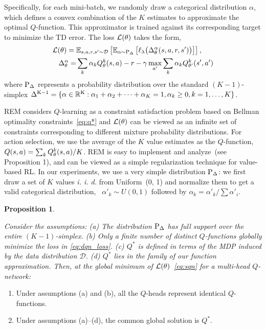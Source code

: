 Specifically, for each mini-batch, we randomly draw a categorical
distribution $\alpha$, which defines a convex combination of the $K$
estimates to approximate the optimal $Q$-function. This approximator
is trained against its corresponding target to minimize the TD
error. The loss $\mathcal{L}(\theta)$ takes the form,
\begin{align}\label{eq:sqn}
\mathcal{L}(\theta) ={}& \mathbb{E}_{s, a, r, s' \sim \mathcal{D}} \left[\mathbb{E}_{\alpha \sim {\textnormal{P}}_{\Delta}} \left[\ell_{\lambda} \big( \Delta^{\alpha}_\theta(s, a, r, s') \big)\right]\right], \\
\Delta^{\alpha}_\theta =& \sum_{k} \alpha_{k} Q_{\theta}^{k}(s, a) - r - \gamma\max_{a'} \sum_{k} \alpha_{k}Q_{\theta^{\prime}}^{k}(s', a') \nonumber
\end{align}
where ${\textnormal{P}}_{\Delta}$ represents a probability distribution over the
standard $(K-1)$-simplex $\Delta^{{\textnormal{K}} - 1}
= \{\alpha \in \mathbb{R}^{{\textnormal{K}}}: \alpha_{1}+ \alpha_{2} + \dots
+ \alpha_{K}=1, \alpha_{k}\geq 0, k=1,\dots,K\}$.

REM considers $Q$-learning as a constraint satisfaction problem based
on Bellman optimality constraints~\eqref{eq:q*} and $\mathcal{L}(\theta)$ can be viewed as an infinite set of constraints
corresponding to different mixture probability distributions.
For action selection, %
we use the average of the $K$ value estimates as the $Q$-function, \ie~$Q(s,a)
= \sum_{k} Q_{\theta}^{k}(s, a) / K$. REM is easy to implement and analyze~(see Proposition 1),
and can be viewed as a simple regularization technique for value-based RL.
In our experiments, we use a very
simple distribution ${\textnormal{P}}_{\Delta}$: we first
draw a set of $K$ values {\em i. \!i.\! d.} from Uniform~(0, 1) and
normalize them to get a valid categorical
distribution, \ie~$\alpha'_k \sim U(0, 1)$ followed by $\alpha_k
= \alpha'_k / \sum \alpha'_i$.

\textbf{Proposition 1}.
{\it
Consider the assumptions:
(a) The distribution ${\textnormal{P}}_{\Delta}$ has full support over the entire $(K-1)$-simplex.
(b) Only a finite number of distinct $Q$-functions globally minimize the loss in \eqref{eq:dqn_loss}.
(c) $Q^*$ is defined in terms of the MDP induced by the data distribution $\mathcal{D}$.
(d) $Q^*$ lies in the family of our function approximation.
Then, at the global minimum of $\mathcal{L}({\theta})$~\eqref{eq:sqn} for a multi-head $Q$-network:
\begin{enumerate}[label=(\roman*)]
\itemsep0.14em
\item Under assumptions (a) and (b), all the $Q$-heads represent identical $Q$-functions.
\item Under assumptions (a)--(d), the common global solution is $Q^*$.
\end{enumerate}
}

